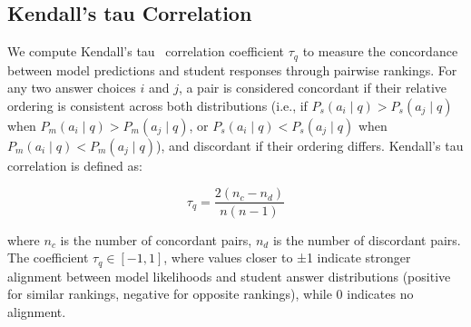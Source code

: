 \subsection{Kendall's tau Correlation}
We compute Kendall's tau~\cite{kendall1938new} correlation coefficient $\tau_q$ to measure the concordance between model predictions and student responses through pairwise rankings. For any two answer choices $i$ and $j$, a pair is considered concordant if their relative ordering is consistent across both distributions (i.e., if $P_s(a_i \mid q) > P_s(a_j \mid q)$ when $P_m(a_i \mid q) > P_m(a_j \mid q)$, or $P_s(a_i \mid q) < P_s(a_j \mid q)$ when $P_m(a_i \mid q) < P_m(a_j \mid q)$), and discordant if their ordering differs. Kendall's tau correlation is defined as:

$$\tau_q = \frac{2(n_c - n_d)}{n(n-1)}$$

where $n_c$ is the number of concordant pairs, $n_d$ is the number of discordant pairs. The coefficient $\tau_q \in [-1, 1]$, where values closer to ±1 indicate stronger alignment between model likelihoods and student answer distributions (positive for similar rankings, negative for opposite rankings), while 0 indicates no alignment.


